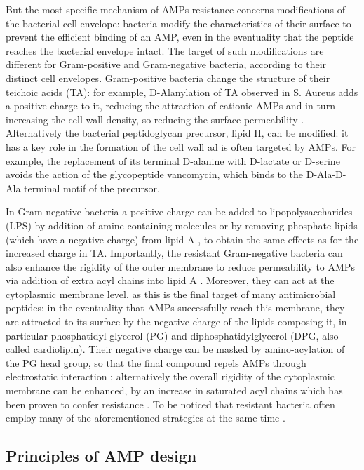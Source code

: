 But the most specific mechanism of AMPs resistance concerns modifications of the bacterial cell envelope: bacteria modify the characteristics of their surface to prevent the efficient binding of an AMP, even in the eventuality that the peptide reaches the bacterial envelope intact. 
%
The target of such modifications are different for Gram-positive and Gram-negative bacteria, according to their distinct cell envelopes.
%
Gram-positive bacteria change the structure of their teichoic acids (TA): for example, D-Alanylation of TA observed in S. Aureus adds a positive charge to it, reducing the attraction of cationic AMPs and in turn increasing the cell wall density, so reducing the surface permeability \citep{Saar-Dover2012}.
%
Alternatively the bacterial peptidoglycan precursor, lipid II, can be modified: it has a key role in the formation of the cell wall ad is often targeted by AMPs. For example, the replacement of its terminal D-alanine with D-lactate or D-serine \citep{Bugg1991} avoids the action of the glycopeptide vancomycin, which binds to the D-Ala-D-Ala terminal motif of the precursor.

In Gram-negative bacteria a positive charge can be added to lipopolysaccharides (LPS) by addition of amine-containing molecules \citep{Moskowitz2004} or by removing phosphate lipids (which have a negative charge) from lipid A \citep{Wang2006lpx}, to obtain the same effects as for the increased charge in TA.
%
Importantly, the resistant Gram-negative bacteria can also enhance the rigidity of the outer membrane to reduce permeability to AMPs via addition of extra acyl chains into lipid A \citep{Guo1998}.
%
Moreover, they can act at the cytoplasmic membrane level, as this is the final target of many antimicrobial peptides: in the eventuality that AMPs successfully reach this membrane, they are attracted to its surface by the negative charge of the lipids composing it, in particular phosphatidyl-glycerol (PG) and diphosphatidylglycerol (DPG, also called cardiolipin). Their negative charge can be masked by amino-acylation of the PG head group, so that the final compound repels AMPs through electrostatic interaction \citep{Peschel2001}; alternatively the overall rigidity of the cytoplasmic membrane can be enhanced, by an increase in saturated acyl chains which has been proven to confer resistance \citep{Kumariya2015}.
%
To be noticed that resistant bacteria often employ many of the aforementioned strategies at the same time \citep{Band2014}.


\subsection{Principles of AMP design} \label{sec:amp_design}

